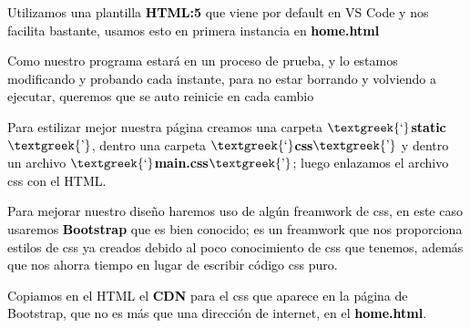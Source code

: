 \documentclass[a4paper]{article}
\begin{document}


\centering
{}
\par

\bigskip

{
\textcolor{black}{Utilizamos una plantilla }\textbf{\textcolor{black}{HTML:5}}\textcolor{black}{ que viene por default
en VS Code y nos facilita bastante, usamos esto en primera instancia en }\textbf{\textcolor{black}{home.html}}}


\bigskip

{
\textcolor{black}{Como nuestro programa estará en un proceso de prueba, y lo estamos modificando y probando cada
instante, para no estar borrando y volviendo a ejecutar, queremos que se auto reinicie en cada cambio}}





\bigskip


\bigskip

{
\textcolor{black}{Para estilizar mejor nuestra página creamos una carpeta
$\text{\textgreek{‘}}$}\textbf{\textcolor{black}{static$\text{\textgreek{’}}$}}\textcolor{black}{, dentro una carpeta
$\text{\textgreek{‘}}$}\textbf{\textcolor{black}{css$\text{\textgreek{’}}$}}\textcolor{black}{ y dentro un archivo
$\text{\textgreek{‘}}$}\textbf{\textcolor{black}{main.css$\text{\textgreek{’}}$}}\textcolor{black}{; luego enlazamos el
archivo css con el HTML.}}


\bigskip

{
\textcolor{black}{Para mejorar nuestro diseño haremos uso de algún freamwork de css, en este caso usaremos
}\textbf{\textcolor{black}{Bootstrap}}\textcolor{black}{ que es bien conocido; es un freamwork que nos proporciona
estilos de css ya creados debido al poco conocimiento de css que tenemos, además que nos ahorra tiempo en lugar de
escribir código css puro.}}


\bigskip

{
\textcolor{black}{Copiamos en el HTML el }\textbf{\textcolor{black}{CDN}}\textcolor{black}{ para el css que aparece en
la página de Bootstrap, que no es más que una dirección de internet, en el
}\textbf{\textcolor{black}{home.html}}\textcolor{black}{.}}
\end{document}

